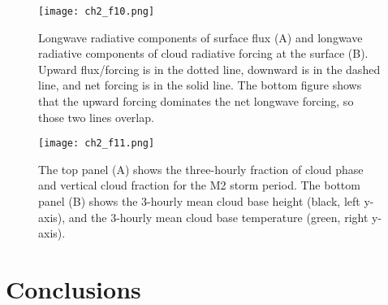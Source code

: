 \begin{figure}[H]
    \centering
    \texttt{[image: ch2\_f10.png]}
    \caption[Longwave radiative components of flux and forcing]{Longwave radiative components of surface flux (A) and longwave radiative components of cloud radiative forcing at the surface (B). Upward flux/forcing is in the dotted line, downward is in the dashed line, and net forcing is in the solid line. The bottom figure shows that the upward forcing dominates the net longwave forcing, so those two lines overlap.}
    \label{fig:ch2_f10}
\end{figure}

\begin{figure}[H]
    \centering
    \texttt{[image: ch2\_f11.png]}
    \caption[Cloud phase, fraction, base height, and base temperature.]{The top panel (A) shows the three-hourly fraction of cloud phase and vertical cloud fraction for the M2 storm period. The bottom panel (B) shows the 3-hourly mean cloud base height (black, left y-axis), and the 3-hourly mean cloud base temperature (green, right y-axis).}
    \label{fig:ch2_f11}
\end{figure}

\section{Conclusions}